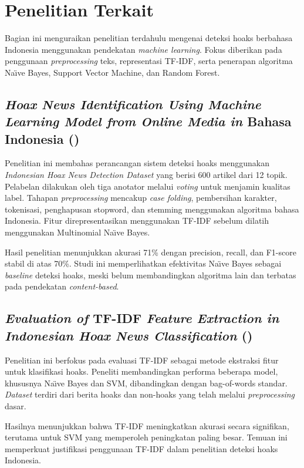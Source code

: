 \section{Penelitian Terkait}

Bagian ini menguraikan penelitian terdahulu mengenai deteksi hoaks berbahasa Indonesia menggunakan pendekatan \textit{machine learning}. Fokus diberikan pada penggunaan \textit{preprocessing} teks, representasi TF-IDF, serta penerapan algoritma Na\"{\i}ve Bayes, Support Vector Machine, dan Random Forest.

\subsection{\textit{Hoax News Identification Using Machine Learning Model from Online Media in} Bahasa Indonesia (\textcite{pratiwi2022hoax})}

Penelitian ini membahas perancangan sistem deteksi hoaks menggunakan \textit{Indonesian Hoax News Detection Dataset} yang berisi 600 artikel dari 12 topik. Pelabelan dilakukan oleh tiga anotator melalui \textit{voting} untuk menjamin kualitas label. Tahapan \textit{preprocessing} mencakup \textit{case folding}, pembersihan karakter, tokenisasi, penghapusan stopword, dan stemming menggunakan algoritma bahasa Indonesia. Fitur direpresentasikan menggunakan TF-IDF sebelum dilatih menggunakan Multinomial Na\"{\i}ve Bayes.

Hasil penelitian menunjukkan akurasi 71\% dengan precision, recall, dan F1-score stabil di atas 70\%. Studi ini memperlihatkan efektivitas Na\"{\i}ve Bayes sebagai \textit{baseline} deteksi hoaks, meski belum membandingkan algoritma lain dan terbatas pada pendekatan \textit{content-based}.

\subsection{\textit{Evaluation of} TF-IDF \textit{Feature Extraction in Indonesian Hoax News Classification} (\textcite{prasetyo2019evaluation})}

Penelitian ini berfokus pada evaluasi TF-IDF sebagai metode ekstraksi fitur untuk klasifikasi hoaks. Peneliti membandingkan performa beberapa model, khususnya Na\"{\i}ve Bayes dan SVM, dibandingkan dengan bag-of-words standar. \textit{Dataset} terdiri dari berita hoaks dan non-hoaks yang telah melalui \textit{preprocessing} dasar.

Hasilnya menunjukkan bahwa TF-IDF meningkatkan akurasi secara signifikan, terutama untuk SVM yang memperoleh peningkatan paling besar. Temuan ini memperkuat justifikasi penggunaan TF-IDF dalam penelitian deteksi hoaks Indonesia.

